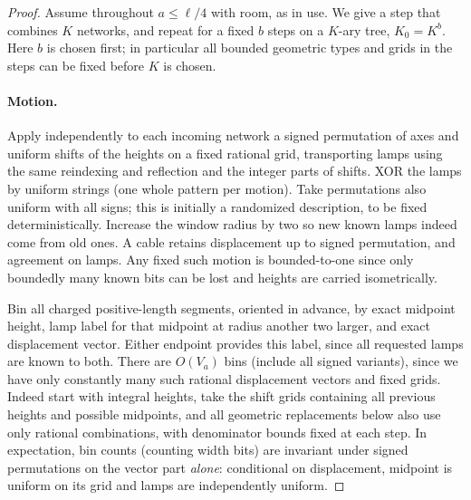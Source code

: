 \documentclass[11pt,letterpaper]{article}
\theoremstyle{definition}
\numberwithin{equation}{section}
\begin{document}
\begin{proof}
Assume throughout $a\le \ell/4$ with room, as in use. We give a step that combines $K$
networks, and repeat for a fixed $b$ steps on a $K$-ary tree, $K_0=K^b$. Here $b$ is chosen first;
in particular all bounded geometric types and grids in the steps can be fixed before $K$ is
chosen.

\paragraph{Motion.}
Apply independently to each incoming network a signed permutation of axes and
uniform shifts of the heights on a fixed rational grid, transporting lamps using the same
reindexing and reflection and the integer parts of shifts. XOR the lamps by uniform strings
(one whole pattern per motion). Take permutations also uniform with all signs; this is
initially a randomized description, to be fixed deterministically. Increase the window radius
by two so new known lamps indeed come from old ones. A cable retains displacement up
to signed permutation, and agreement on lamps. Any fixed such motion is bounded-to-one
since only boundedly many known bits can be lost and heights are carried isometrically.

Bin all charged positive-length segments, oriented in advance, by exact midpoint height,
lamp label for that midpoint at radius another two larger, and exact displacement vector.
Either endpoint provides this label, since all requested lamps are known to both. There are
$O(V_a)$ bins (include all signed variants), since we have only constantly many such rational
displacement vectors and fixed grids. Indeed start with integral heights, take the shift
grids containing all previous heights and possible midpoints, and all geometric replacements
below also use only rational combinations, with denominator bounds fixed at each step. In
expectation, bin counts (counting width bits) are invariant under signed permutations on
the vector part \emph{alone}: conditional on displacement, midpoint is uniform on its grid and
lamps are independently uniform.


\end{proof}
\end{document}
